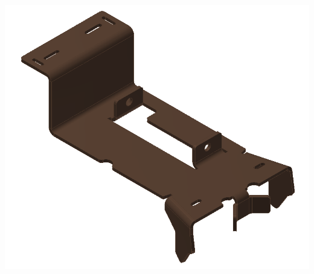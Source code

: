 \begin{minipage}{\linewidth}
\begin{minipage}[c]{0.62\linewidth}
\includegraphics[width=\linewidth,valign=t]{../Common/images/CommercialBracket_model}
 \label{fig:results:stdbracketmodel}



\end{minipage}
\end{minipage}
